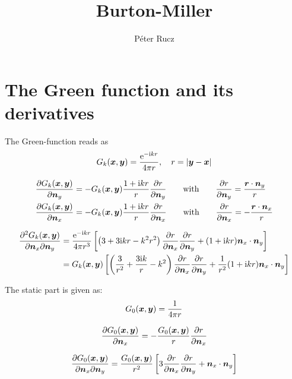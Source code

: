 \documentclass[a4paper, 10pt]{article}
\author{Péter Rucz}
\title{Burton-Miller}
\newcommand{\te}{\mathrm{e}}
\newcommand{\ti}{\mathrm{i}}
\newcommand{\tn}{\bm{\mathnormal{n}}}
\newcommand{\tr}{\bm{\mathnormal{r}}}
\newcommand{\tx}{\bm{\mathnormal{x}}}
\newcommand{\ty}{\bm{\mathnormal{y}}}
\begin{document}
\maketitle

\section{The Green function and its derivatives}

The Green-function reads as
%
\begin{equation}
	G_k(\tx, \ty) = \frac{\te^{-\ti k r}}{4 \pi r}, \quad
	r = |\ty - \tx|
\end{equation}

\begin{align}
	\frac{\partial G_k(\tx, \ty)}{\partial \tn_y}
	&= -G_k(\tx, \ty) \frac{1 + \ti kr}{r}\frac{\partial r}{\partial \tn_y} \qquad \text{with} \qquad \frac{\partial r}{\partial \tn_y} = \frac{\tr \cdot \tn_y}{r} \\
	\frac{\partial G_k(\tx, \ty)}{\partial \tn_x}
	&= -G_k(\tx, \ty) \frac{1 + \ti kr}{r}\frac{\partial r}{\partial \tn_x} \qquad \text{with} \qquad \frac{\partial r}{\partial \tn_x} = -\frac{\tr \cdot \tn_x}{r}
\end{align}

\begin{align}
	\frac{\partial^2 G_k(\tx, \ty)}{\partial \tn_x \partial \tn_y}
	&= \frac{\te^{- \ti kr}}{4 \pi r^3}\left[\left(3 + 3 \ti kr - k^2 r^2\right) \frac{\partial r}{\partial \tn_x}\frac{\partial r}{\partial \tn_y} + (1 + \ti kr) \tn_x \cdot \tn_y \right] \\
	&= G_k(\tx,\ty)\left[\left(\frac{3}{r^2} + \frac{3\ti k}{r} - k^2\right) \frac{\partial r}{\partial \tn_x}\frac{\partial r}{\partial \tn_y}
	+ \frac{1}{r^2}(1 + \ti kr) \tn_x \cdot \tn_y \right]
\end{align}

The static part is given as:
%
\begin{equation}
	G_0(\tx, \ty) = \frac{1}{4\pi r}
\end{equation}

\begin{equation}
	\frac{\partial G_0(\tx, \ty)}{\partial \tn_x} = -\frac{G_0(\tx, \ty)}{r} \frac{\partial r}{\partial \tn_x}
\end{equation}

\begin{equation}
	\frac{\partial G_0(\tx, \ty)}{\partial \tn_x \partial \tn_y} = \frac{G_0(\tx, \ty)}{r^2} \left[3 \frac{\partial r}{\partial \tn_x}\frac{\partial r}{\partial \tn_y} + \tn_x \cdot \tn_y \right]
\end{equation}
\end{document}
